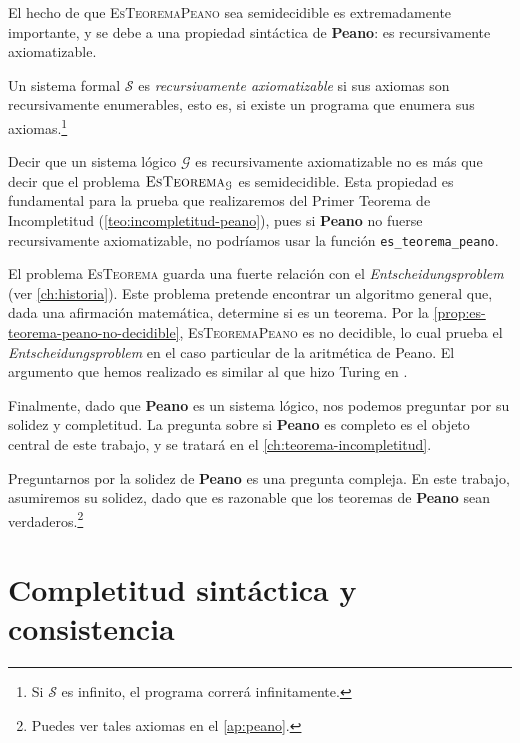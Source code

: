 El hecho de que \textsc{EsTeoremaPeano} sea semidecidible es extremadamente importante, y se debe a una propiedad sintáctica de \textbf{Peano}: es recursivamente axiomatizable.

\begin{definicion}
Un sistema formal $\mathcal{S}$ es \emph{recursivamente axiomatizable} si sus axiomas son recursivamente enumerables, esto es, si existe un programa que enumera sus axiomas.\footnote{Si $\mathcal{S}$ es infinito, el programa correrá infinitamente.}
\end{definicion}

Decir que un sistema lógico $\mathcal{G}$ es recursivamente axiomatizable no es más que decir que el problema $\text{\textsc{EsTeorema}}_\mathcal{G}$ es semidecidible. Esta propiedad es fundamental para la prueba que realizaremos del Primer Teorema de Incompletitud (\cref{teo:incompletitud-peano}), pues si \textbf{Peano} no fuerse recursivamente axiomatizable, no podríamos usar la función \texttt{es\_teorema\_peano}.

El problema \textsc{EsTeorema} guarda una fuerte relación con el \emph{Entscheidungsproblem} (ver \cref{ch:historia}). Este problema pretende encontrar un algoritmo general que, dada una afirmación matemática, determine si es un teorema. Por la \cref{prop:es-teorema-peano-no-decidible}, \textsc{EsTeoremaPeano} es no decidible, lo cual prueba el \emph{Entscheidungsproblem} en el caso particular de la aritmética de Peano. El argumento que hemos realizado es similar al que hizo Turing en \cite{Turing1937}.

Finalmente, dado que \textbf{Peano} es un sistema lógico, nos podemos preguntar por su solidez y completitud. La pregunta sobre si \textbf{Peano} es completo es el objeto central de este trabajo, y se tratará en el \cref{ch:teorema-incompletitud}.

Preguntarnos por la solidez de \textbf{Peano} es una pregunta compleja. En este trabajo, asumiremos su solidez, dado que es razonable que los teoremas de \textbf{Peano} sean verdaderos.\footnote{Puedes ver tales axiomas en el \cref{ap:peano}.}

\section{Completitud sintáctica y consistencia}\label{sec:consistencia}

